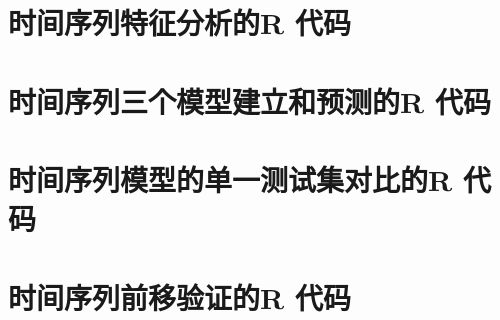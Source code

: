 \section{时间序列特征分析的R 代码}\label{appendix:A}


\section{时间序列三个模型建立和预测的R 代码}\label{appendix:B}


\section{时间序列模型的单一测试集对比的R 代码}\label{appendix:D}



\section{时间序列前移验证的R 代码}\label{appendix:C}


\label{endofThesis}